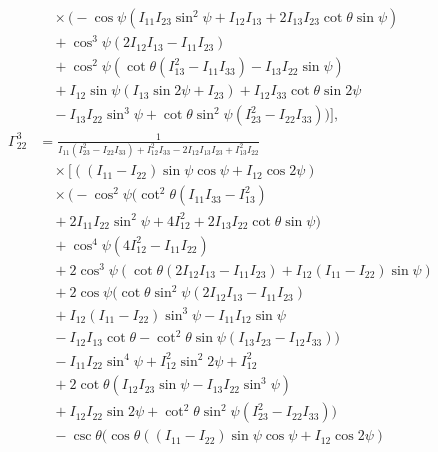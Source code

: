 \documentclass[pdflatex,sn-mathphys-num]{sn-jnl}%
\theoremstyle{thmstyleone}%
\theoremstyle{thmstyletwo}%
\theoremstyle{thmstylethree}%
\begin{document}
\begin{appendices}
\begin{align}
    &\quad \times \bigg(-\cos \psi \left(I_{11} I_{23} \sin ^2\psi+I_{12} I_{13}+2 I_{13} I_{23} \cot \theta \sin \psi\right) \nonumber \\
    &\quad +\cos ^3\psi (2 I_{12} I_{13}-I_{11} I_{23}) \nonumber \\
    &\quad +\cos ^2\psi \left(\cot \theta \left(I_{13}^2-I_{11} I_{33}\right)-I_{13} I_{22} \sin \psi\right) \nonumber \\
    &\quad +I_{12} \sin \psi (I_{13} \sin 2\psi+I_{23}) +I_{12} I_{33} \cot \theta \sin 2\psi \nonumber \\
    &\quad -I_{13} I_{22} \sin ^3\psi+\cot \theta \sin ^2\psi \left(I_{23}^2-I_{22} I_{33}\right)\bigg) \bigg], \nonumber \\
    \Gamma^{3}_{22} &= \frac{1}{I_{11} \left(I_{23}^2-I_{22} I_{33}\right)+I_{12}^2 I_{33}-2 I_{12} I_{13} I_{23}+I_{13}^2 I_{22}} \nonumber \\
    &\quad \times \bigg[ ((I_{11}-I_{22}) \sin \psi \cos \psi+I_{12} \cos 2\psi) \nonumber \\
    &\quad \times \bigg(-\cos ^2\psi \Big(\cot ^2\theta \left(I_{11} I_{33}-I_{13}^2\right) \nonumber \\
    &\quad +2 I_{11} I_{22} \sin ^2\psi+4 I_{12}^2+2 I_{13} I_{22} \cot \theta \sin \psi\Big) \nonumber \\
    &\quad +\cos ^4\psi \left(4 I_{12}^2-I_{11} I_{22}\right) \nonumber \\
    &\quad +2 \cos ^3\psi (\cot \theta (2 I_{12} I_{13}-I_{11} I_{23})+I_{12} (I_{11}-I_{22}) \sin \psi) \nonumber \\
    &\quad +2 \cos \psi \Big(\cot \theta \sin ^2\psi (2 I_{12} I_{13}-I_{11} I_{23}) \nonumber \\
    &\quad +I_{12} (I_{11}-I_{22}) \sin ^3\psi -I_{11} I_{12} \sin \psi \nonumber \\
    &\quad -I_{12} I_{13} \cot \theta-\cot ^2\theta \sin \psi (I_{13} I_{23}-I_{12} I_{33})\Big) \nonumber \\
    &\quad -I_{11} I_{22} \sin ^4\psi+I_{12}^2 \sin ^2 2\psi+I_{12}^2 \nonumber \\
    &\quad +2 \cot \theta \left(I_{12} I_{23} \sin \psi-I_{13} I_{22} \sin ^3\psi\right) \nonumber \\
    &\quad +I_{12} I_{22} \sin 2\psi+\cot ^2\theta \sin ^2\psi \left(I_{23}^2-I_{22} I_{33}\right)\bigg) \nonumber \\
    &\quad -\csc \theta (\cos \theta ((I_{11}-I_{22}) \sin \psi \cos \psi+I_{12} \cos 2\psi) \nonumber \\

\end{align}
\end{appendices}
\end{document}
